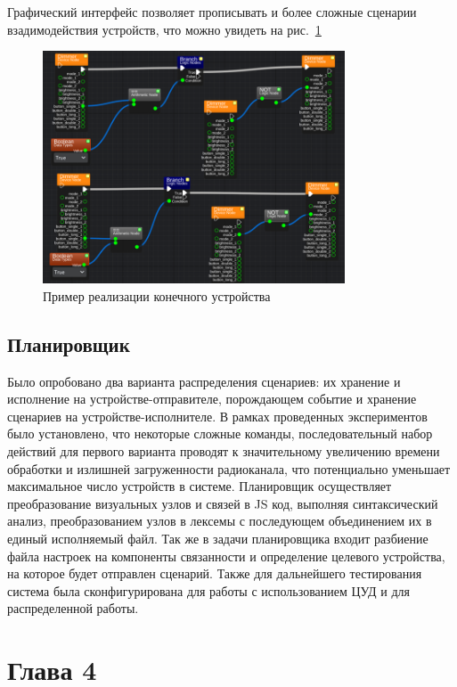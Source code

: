\documentclass[a4paper,12pt]{article}
\begin{document}
Графический интерфейс позволяет прописывать и более сложные сценарии взадимодействия устройств, что можно увидеть на рис.~\ref{fig:GUI_adv}

\begin{figure}[h]
    \centering
    \includegraphics[width=0.8\textwidth]{images/Fig12.png}
    \caption{Пример реализации конечного устройства}
    \label{fig:GUI_adv}
\end{figure}

\subsection{Планировщик}
Было опробовано два варианта распределения сценариев: их хранение и исполнение на устройстве-отправителе, порождающем событие и хранение сценариев на устройстве-исполнителе. В рамках проведенных экспериментов было установлено, что некоторые сложные команды, последовательный набор действий для первого варианта проводят к значительному увеличению времени обработки и излишней загруженности радиоканала, что потенциально уменьшает максимальное число устройств в системе.
Планировщик осуществляет преобразование визуальных узлов и связей в JS код, выполняя синтаксический анализ, преобразованием узлов в лексемы с последующем объединением их в единый исполняемый файл. Так же в задачи планировщика входит разбиение файла настроек на компоненты связанности и определение целевого устройства, на которое будет отправлен сценарий.
Также для дальнейшего тестирования система была сконфигурирована для работы с использованием ЦУД и для распределенной работы.

\newpage

\section{Глава 4}
\end{document}

